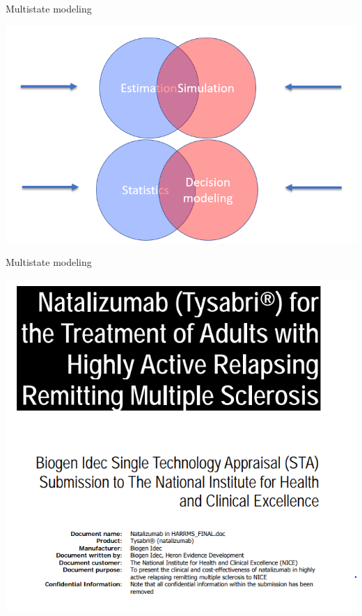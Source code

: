 \documentclass[
  ignorenonframetext,
]{beamer}
\begin{document}
\begin{frame}{Multistate modeling}
\protect\hypertarget{multistate-modeling-5}{}

\includegraphics[width=1\linewidth]{figures/venn}

\end{frame}

\begin{frame}{Multistate modeling}
\protect\hypertarget{multistate-modeling-6}{}

\includegraphics[width=1\linewidth]{figures/msmnice}

\end{frame}
\end{document}
